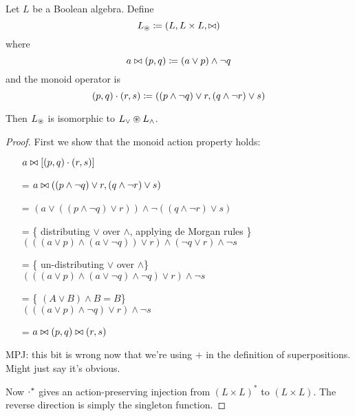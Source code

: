 \begin{prop}
  Let $L$ be a Boolean algebra. Define
  $$L_\circledast \coloneqq (L,L \times L,\bowtie)$$
  where
  $$a \bowtie (p, q) \coloneqq (a \vee p) \wedge \neg q$$
  and the monoid operator is
  $$(p, q) \cdot (r, s) \coloneqq ((p \wedge \neg q) \vee r, (q \wedge \neg r) \vee s)$$

  Then $L_\circledast$ is isomorphic to $L_\vee \circledast L_\wedge$.
\end{prop}
\ifproofs
\begin{proof}
  First we show that the monoid action property holds:
  \begin{itemize}
    \item[ ]$a \bowtie \left[(p, q) \cdot (r, s)\right]$
    \item[=]$a \bowtie ((p \wedge \neg q) \vee r, (q \wedge \neg r) \vee s)$
    \item[=]$
      \left(
        a \vee
        \left(
          \left(
            p \wedge \neg q
          \right)
          \vee r
        \right)
      \right)
      \wedge \neg
      \left(
        \left(
          q \wedge \neg r
        \right)
        \vee s
      \right)$
    \item[=]\{ distributing $\vee$ over $\wedge$, applying de Morgan rules \}\\
      $
      \left(
        \left(
          \left(  
            a \vee p
          \right)
          \wedge
          \left(
            a \vee \neg q
          \right)
        \right)
        \vee r
      \right)
      \wedge 
      \left(
        \neg q \vee r
      \right)
      \wedge
      \neg s
      $
    \item[=]\{ un-distributing $\vee$ over $\wedge $\}\\
      $
      \left(
        \left(
          \left(  
            a \vee p
          \right)
          \wedge
          \left(
            a \vee \neg q
          \right)
          \wedge
          \neg q
        \right)
        \vee r
      \right)
      \wedge
      \neg s
      $
    \item[=]\{ $(A \vee B) \wedge B = B$\}\\
      $
      \left(
        \left(
          \left(  
            a \vee p
          \right)
          \wedge
          \neg q
        \right)
        \vee r
      \right)
      \wedge
      \neg s
      $
    \item[=]$a \bowtie (p, q) \bowtie (r, s)$
  \end{itemize}


  MPJ: this bit is wrong now that we're using $+$ in the definition of
  superpositions. Might just say it's obvious.
  
  Now $\cdot^\ast$ gives an action-preserving injection from $(L \times
  L)^\ast$ to $(L \times L)$. The reverse direction is simply the singleton function.
\end{proof}
\fi

